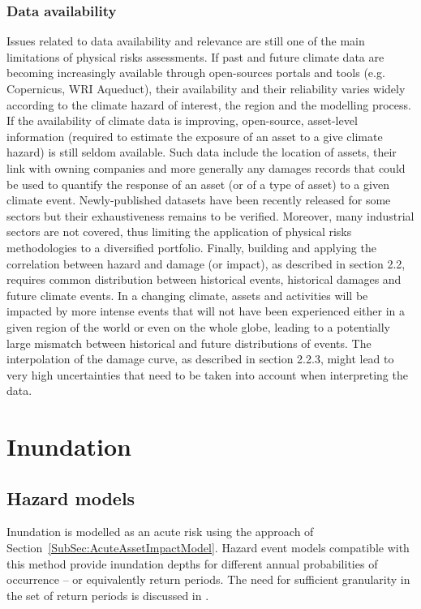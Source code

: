 \documentclass{article}
\begin{document}
\subsubsection{Data availability}
Issues related to data availability and relevance are still one of the main limitations of physical risks assessments. If past and future climate data are becoming increasingly available through open-sources portals and tools (e.g. Copernicus, WRI Aqueduct), their availability and their reliability varies widely according to the climate hazard of interest, the region and the modelling process. If the availability of climate data is improving, open-source, asset-level information (required to estimate the exposure of an asset to a give climate hazard) is still seldom available. Such data include the location of assets, their link with owning companies and more generally any damages records that could be used to quantify the response of an asset (or of a type of asset) to a given climate event. Newly-published datasets have been recently released for some sectors but their exhaustiveness remains to be verified. Moreover, many industrial sectors are not covered, thus limiting the application of physical risks methodologies to a diversified portfolio.
Finally, building and applying the correlation between hazard and damage (or impact), as described in section 2.2, requires common distribution between historical events, historical damages and future climate events. In a changing climate, assets and activities will be impacted by more intense events that will not have been experienced either in a given region of the world or even on the
whole globe, leading to a potentially large mismatch between historical and future distributions of events. The interpolation of the damage curve, as described in section 2.2.3, might lead to very high uncertainties that need to be taken into account when interpreting the data.







\section{Inundation}

\subsection{Hazard models}
Inundation is modelled as an acute risk using the approach of Section~\ref{SubSec:AcuteAssetImpactModel}. Hazard event models compatible with this method provide inundation depths for different annual probabilities of occurrence -- or equivalently return periods. The need for sufficient granularity in the set of return periods is discussed in \cite{WardEtAl:2011}. 
\end{document}
